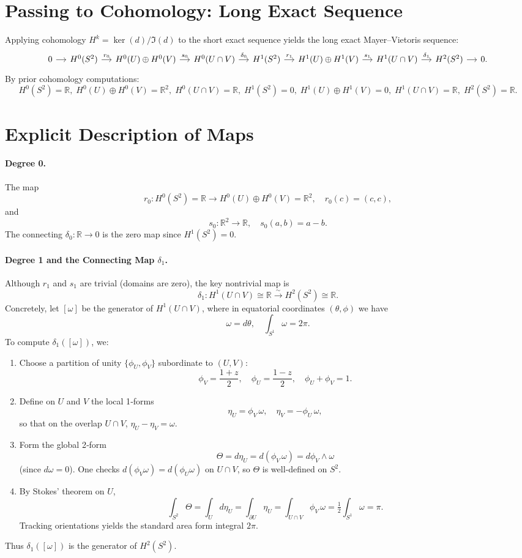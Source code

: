 \documentclass[11pt]{article}
\newcommand{\R}{\mathbb{R}}
\begin{document}
	\section{Passing to Cohomology: Long Exact Sequence}
	Applying cohomology $H^k=\ker(d)/\Im(d)$ to the short exact sequence yields the long exact Mayer–Vietoris sequence:
	\[
	\begin{tikzcd}[column sep=small]
		0 \ar[r]
		& H^0(S^2) \ar[r,"r_0"]
		& H^0(U)\oplus H^0(V) \ar[r,"s_0"]
		& H^0(U\cap V) \ar[r,"\delta_0"]
		& H^1(S^2) \ar[r,"r_1"]
		& H^1(U)\oplus H^1(V) \ar[r,"s_1"]
		& H^1(U\cap V) \ar[r,"\delta_1"]
		& H^2(S^2) \ar[r]
		& 0.
	\end{tikzcd}
	\]
	By prior cohomology computations:
	\[
	H^0(S^2)=\R,
	\;H^0(U)\oplus H^0(V)=\R^2,
	\;H^0(U\cap V)=\R,
	\;H^1(S^2)=0,
	\;H^1(U)\oplus H^1(V)=0,
	\;H^1(U\cap V)=\R,
	\;H^2(S^2)=\R.
	\]
	
	\section{Explicit Description of Maps}
	\paragraph{Degree 0.}
	The map
	\[
	r_0: H^0(S^2)=\R \longrightarrow H^0(U)\oplus H^0(V)=\R^2,
	\quad r_0(c)=(c,c),
	\]
	and
	\[
	s_0: \R^2 \to \R,
	\quad s_0(a,b)=a-b.
	\]
	The connecting $\delta_0:\R\to0$ is the zero map since $H^1(S^2)=0$.  
	
	\paragraph{Degree 1 and the Connecting Map $\delta_1$.}
	Although $r_1$ and $s_1$ are trivial (domains are zero), the key nontrivial map is
	\[
	\delta_1: H^1(U\cap V)\cong\R \xrightarrow{\sim} H^2(S^2)\cong\R.
	\]
	Concretely, let $[\omega]$ be the generator of $H^1(U\cap V)$, where in equatorial coordinates $(\theta,\phi)$ we have
	\[
	\omega=d\theta,
	\quad \int_{S^1}\omega=2\pi.
	\]
	To compute $\delta_1([\omega])$, we:
	\begin{enumerate}
		\item Choose a partition of unity $\{\phi_U,\phi_V\}$ subordinate to $(U,V)$:
		\[
		\phi_V=\frac{1+z}{2},\quad \phi_U=\frac{1-z}{2},
		\quad \phi_U+\phi_V=1.
		\]
		\item Define on $U$ and $V$ the local 1‑forms
		\[
		\eta_U=\phi_V\,\omega,
		\quad
		\eta_V=-\phi_U\,\omega,
		\]
		so that on the overlap $U\cap V$, $\eta_U-\eta_V=\omega$.
		\item Form the global 2‑form
		\[
		\Theta
		=d\eta_U = d(\phi_V\,\omega) = d\phi_V\wedge\omega
		\]
		(since $d\omega=0$).  One checks $d(\phi_V\omega)=d(\phi_U\omega)$ on $U\cap V$, so $\Theta$ is well‑defined on $S^2$.
		\item By Stokes’ theorem on $U$,
		\[
		\int_{S^2}\Theta
		= \int_U d\eta_U
		= \int_{\partial U} \eta_U
		= \int_{U\cap V} \phi_V\,\omega = \tfrac12\int_{S^1}\omega = \pi.
		\]
		Tracking orientations yields the standard area form integral $2\pi$.
	\end{enumerate}
	Thus $\delta_1([\omega])$ is the generator of $H^2(S^2)$.
	
\end{document}
